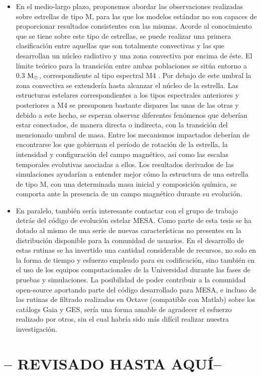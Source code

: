 \begin{itemize}
    \item En el medio-largo plazo, proponemos abordar las observaciones realizadas sobre estrellas de tipo M, para las que los modelos estándar no son capaces de proporcionar resultados consistentes con las mismas. Acorde al conocimiento que se tiene sobre este tipo de estrellas, se puede realizar una primera clasificación entre aquellas que son totalmente convectivas y las que desarrollan un núcleo radiativo y una zona convectiva por encima de éste. El límite teórico para la transición entre ambas poblaciones se sitúa entorno a 0.3 $\mathrm{M}_\odot$, correspondiente al tipo espectral M4 \citep{Stassun2010}. Por debajo de este umbral la zona convectiva se extendería hasta alcanzar el núcleo de la estrella. Las estructuras estelares correspondientes a los tipos espectrales anteriores y posteriores a M4 se presuponen bastante dispares las unas de las otras y debido a este hecho, se esperan observar diferentes fenómenos que deberían estar conectados, de manera directa o indirecta, con la transición del mencionado umbral de masa. Entre los mecanismos impactados deberían de encontrarse los que gobiernan el período de rotación de la estrella, la intensidad y configuración del campo magnético, así como las escalas temporales evolutivas asociadas a ellos. Los resultados derivados de las simulaciones ayudarían a entender mejor cómo la estructura de una estrella de tipo M, con una determinada masa inicial y composición química, se comporta ante la presencia de un campo magnético durante su evolución.
    \item En paralelo, también sería interesante contactar con el grupo de trabajo detrás del código de evolución estelar MESA. Como parte de esta tesis se ha dotado al mismo de una serie de nuevas características no presentes en la distribución disponible para la comunidad de usuarios. En el desarrollo de estas rutinas se ha invertido una cantidad considerable de recursos, no solo en la forma de tiempo y esfuerzo empleado para su codificación, sino también en el uso de los equipos computacionales de la Universidad durante las fases de pruebas y simulaciones. La posibilidad de poder contribuir a la comunidad open-source aportando parte del código desarrollado para MESA, e incluso de las rutinas de filtrado realizadas en Octave (compatible con Matlab) sobre los catálogs Gaia y GES, sería una forma amable de agradecer el esfuerzo realizado por otros, sin el cual habría sido más difícil realizar nuestra investigación.
\end{itemize}
\section{-- REVISADO HASTA AQUÍ--}
\endinput
